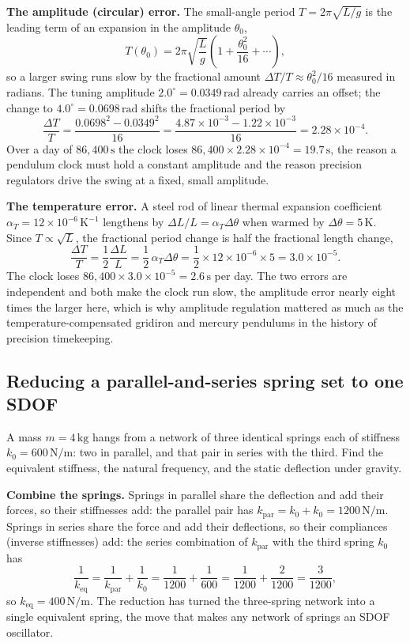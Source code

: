 \textbf{The amplitude (circular) error.} The small-angle period
$T = 2\pi\sqrt{L/g}$ is the leading term of an expansion in the
amplitude $\theta_0$,
\[
T(\theta_0) = 2\pi\sqrt{\frac{L}{g}}\left(1 + \frac{\theta_0^2}{16} +
\cdots\right),
\]
so a larger swing runs slow by the fractional amount $\Delta T/T \approx
\theta_0^2/16$ measured in radians. The tuning amplitude $2.0^\circ =
0.0349\,\text{rad}$ already carries an offset; the change to
$4.0^\circ = 0.0698\,\text{rad}$ shifts the fractional period by
\[
\frac{\Delta T}{T} = \frac{0.0698^2 - 0.0349^2}{16} = \frac{4.87\times
10^{-3} - 1.22\times 10^{-3}}{16} = 2.28\times 10^{-4}.
\]
Over a day of $86{,}400\,\si{\second}$ the clock loses $86{,}400\times
2.28\times 10^{-4} = 19.7\,\si{\second}$, the reason a pendulum clock
must hold a constant amplitude and the reason precision regulators drive
the swing at a fixed, small amplitude.

\textbf{The temperature error.} A steel rod of linear thermal expansion
coefficient $\alpha_T = 12\times 10^{-6}\,\text{K}^{-1}$ lengthens by
$\Delta L/L = \alpha_T\Delta\theta$ when warmed by $\Delta\theta =
5\,\text{K}$. Since $T \propto \sqrt{L}$, the fractional period change is
half the fractional length change,
\[
\frac{\Delta T}{T} = \frac12\frac{\Delta L}{L} = \frac12\,\alpha_T
\Delta\theta = \frac12\times 12\times 10^{-6}\times 5 = 3.0\times
10^{-5}.
\]
The clock loses $86{,}400\times 3.0\times 10^{-5} = 2.6\,\si{\second}$
per day. The two errors are independent and both make the clock run
slow, the amplitude error nearly eight times the larger here, which is
why amplitude regulation mattered as much as the temperature-compensated
gridiron and mercury pendulums in the history of precision timekeeping.

\subsection{Reducing a parallel-and-series spring set to one SDOF}

A mass $m = 4\,\si{\kilogram}$ hangs from a network of three identical
springs each of stiffness $k_0 = 600\,\si{\newton\per\meter}$: two in
parallel, and that pair in series with the third. Find the equivalent
stiffness, the natural frequency, and the static deflection under
gravity.

\textbf{Combine the springs.} Springs in parallel share the deflection
and add their forces, so their stiffnesses add: the parallel pair has
$k_{\text{par}} = k_0 + k_0 = 1200\,\si{\newton\per\meter}$. Springs in
series share the force and add their deflections, so their compliances
(inverse stiffnesses) add: the series combination of $k_{\text{par}}$
with the third spring $k_0$ has
\[
\frac{1}{k_{\text{eq}}} = \frac{1}{k_{\text{par}}} + \frac{1}{k_0} =
\frac{1}{1200} + \frac{1}{600} = \frac{1}{1200} + \frac{2}{1200} =
\frac{3}{1200},
\]
so $k_{\text{eq}} = 400\,\si{\newton\per\meter}$. The reduction has
turned the three-spring network into a single equivalent spring, the
move that makes any network of springs an SDOF oscillator.

